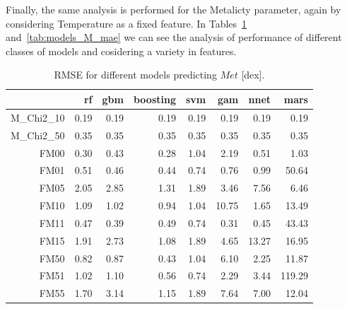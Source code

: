 


 

Finally, the same analysis is performed for the Metalicty parameter, 
again by considering Temperature as a fixed feature.
In Tables~\ref{tab:models_M_rmse} and~\ref{tab:models_M_mae} 
we can see the analysis of performance of different classes of
models and cosidering a variety in features.

\begin{table}[ht]
\centering
\begin{tabular}{rrrrrrrr}
  \hline
 & rf & gbm & boosting & svm & gam & nnet & mars \\ 
  \hline
M\_Chi2\_10 & 0.19 & 0.19 & 0.19 & 0.19 & 0.19 & 0.19 & 0.19 \\ 
 M\_Chi2\_50 & 0.35 & 0.35 & 0.35 & 0.35 & 0.35 & 0.35 & 0.35 \\ 
  FM00 & 0.30 & 0.43 & 0.28 & 1.04 & 2.19 & 0.51 & 1.03 \\ 
  FM01 & 0.51 & 0.46 & 0.44 & 0.74 & 0.76 & 0.99 & 50.64 \\ 
  FM05 & 2.05 & 2.85 & 1.31 & 1.89 & 3.46 & 7.56 & 6.46 \\ 
  FM10 & 1.09 & 1.02 & 0.94 & 1.04 & 10.75 & 1.65 & 13.49 \\ 
  FM11 & 0.47 & 0.39 & 0.49 & 0.74 & 0.31 & 0.45 & 43.43 \\ 
  FM15 & 1.91 & 2.73 & 1.08 & 1.89 & 4.65 & 13.27 & 16.95 \\ 
  FM50 & 0.82 & 0.87 & 0.43 & 1.04 & 6.10 & 2.25 & 11.87 \\ 
  FM51 & 1.02 & 1.10 & 0.56 & 0.74 & 2.29 & 3.44 & 119.29 \\ 
  FM55 & 1.70 & 3.14 & 1.15 & 1.89 & 7.64 & 7.00 & 12.04 \\ 
   \hline
   \end{tabular}
\caption { RMSE for different models predicting $Met$ [dex].} 
\label{tab:models_M_rmse} 
\end{table}
   


